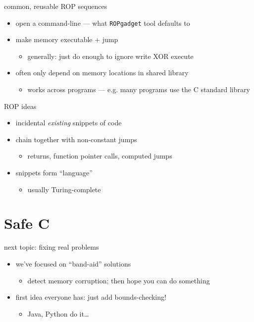 \begin{frame}{common, reusable ROP sequences}
    \begin{itemize}
        \item open a command-line --- what \texttt{ROPgadget} tool defaults to 
        \item make memory executable + jump
            \begin{itemize}
            \item generally: just do enough to ignore write XOR execute
            \end{itemize}
        \item often only depend on memory locations in shared library
            \begin{itemize}
            \item works across programs --- e.g. many programs use the C standard library
            \end{itemize}
    \end{itemize}
\end{frame}

\begin{frame}{ROP ideas}
    \begin{itemize}
        \item incidental \textit{existing} snippets of code
    \item chain together with non-constant jumps
        \begin{itemize}
        \item returns, function pointer calls, computed jumps
        \end{itemize}
    \item snippets form ``language''
        \begin{itemize}
        \item usually Turing-complete
        \end{itemize}
    \end{itemize}
\end{frame}

\section{Safe C}

\begin{frame}{next topic: fixing real problems}
    \begin{itemize}
    \item we've focused on ``band-aid'' solutions
        \begin{itemize}
        \item detect memory corruption; then hope you can do something
        \end{itemize}
    \item first idea everyone has: just add bounds-checking!
        \begin{itemize}
        \item Java, Python do it\ldots
        \end{itemize}
    \end{itemize}
\end{frame}

